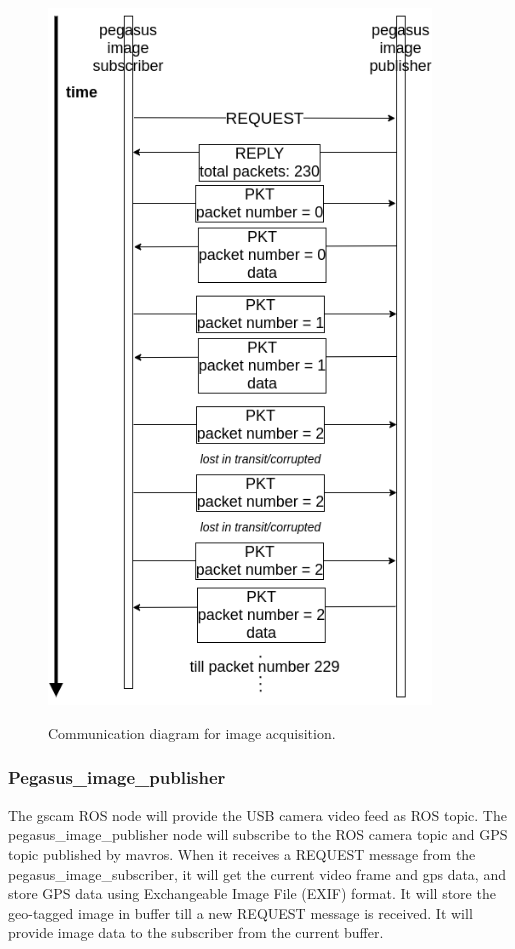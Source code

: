 \begin{figure}
	\centering
	\caption[Communication diagram for image acquisition.]{\small Communication diagram for image acquisition.} 
	\includegraphics[width=4in]{figures/methodology/methodology-image-communication-diagram}
	\label{fig:image-communication-diagram}
\end{figure}


\subsubsection{Pegasus\_image\_publisher}

The gscam ROS node will provide the USB camera video feed as ROS topic. The pegasus\_image\_publisher node will subscribe to the ROS camera topic and GPS topic published by mavros. When it receives a REQUEST message from the pegasus\_image\_subscriber, it will get the current video frame and gps data, and store GPS data using Exchangeable Image File (EXIF) format. It will store the geo-tagged image in buffer till a new REQUEST message is received. It will provide image data to the subscriber from the current buffer.


